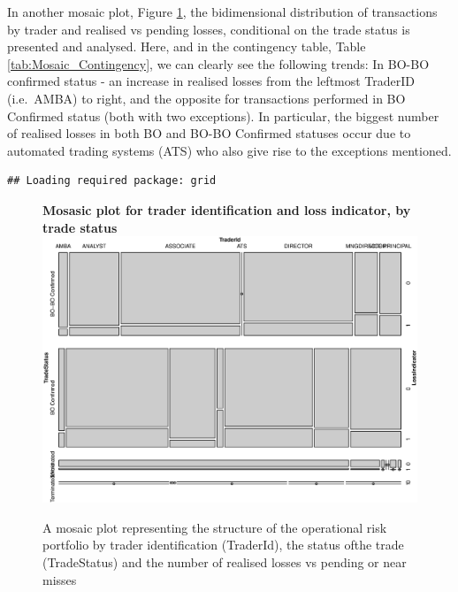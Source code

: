 \documentclass[]{article}
\begin{document}
In another mosaic plot, Figure \ref{Mosaic_Contingency}, the
bidimensional distribution of transactions by trader and realised vs
pending losses, conditional on the trade status is presented and
analysed. Here, and in the contingency table, Table
\ref{tab:Mosaic_Contingency}, we can clearly see the following trends:
In BO-BO confirmed status - an increase in realised losses from the
leftmost TraderID (i.e.~AMBA) to right, and the opposite for
transactions performed in BO Confirmed status (both with two
exceptions). In particular, the biggest number of realised losses in
both BO and BO-BO Confirmed statuses occur due to automated trading
systems (ATS) who also give rise to the exceptions mentioned.\medskip

\singlespacing

\begin{verbatim}
## Loading required package: grid
\end{verbatim}

\singlespacing
\begin{figure}
\centering
\textbf{Mosasic plot for trader identification and loss indicator, by trade status}
\includegraphics[width=\linewidth,height=0.75\linewidth]{Mosaic_Contingency.eps}
\caption[Portfolio structure by trader, trade status and number of realised losses]{A mosaic plot representing the structure of the operational risk portfolio by trader identification (TraderId), the status ofthe trade (TradeStatus) and the number of realised losses vs pending or near misses}
\label{Mosaic_Contingency}
\end{figure}
\doublespacing
\end{document}
